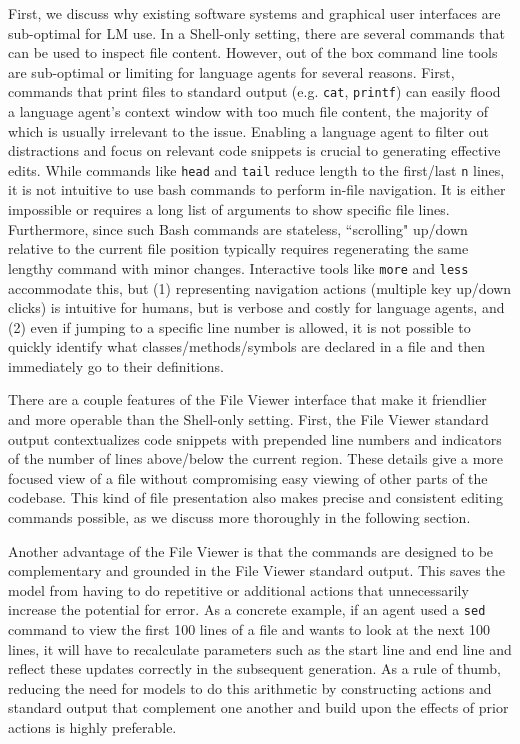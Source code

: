 First, we discuss why existing software systems and graphical user interfaces are sub-optimal for LM use.
In a Shell-only setting, there are several commands that can be used to inspect file content. However, out of the box command line tools are sub-optimal or limiting for language agents for several reasons.
First, commands that print files to standard output (e.g. \texttt{cat}, \texttt{printf}) can easily flood a language agent's context window with too much file content, the majority of which is usually irrelevant to the issue.
Enabling a language agent to filter out distractions and focus on relevant code snippets is crucial to generating effective edits.
While commands like \texttt{head} and \texttt{tail} reduce length to the first/last \texttt{n} lines, it is not intuitive to use bash commands to perform in-file navigation.
It is either impossible or requires a long list of arguments to show specific file lines.
Furthermore, since such Bash commands are stateless, ``scrolling" up/down relative to the current file position typically requires regenerating the same lengthy command with minor changes.
Interactive tools like \texttt{more} and \texttt{less} accommodate this, but (1) representing navigation actions (multiple key up/down clicks) is intuitive for humans, but is verbose and costly for language agents, and (2) even if jumping to a specific line number is allowed, it is not possible to quickly identify what classes/methods/symbols are declared in a file and then immediately go to their definitions.



There are a couple features of the File Viewer interface that make it friendlier and more operable than the Shell-only setting.
First, the File Viewer standard output contextualizes code snippets with prepended line numbers and indicators of the number of lines above/below the current region.
These details give a more focused view of a file without compromising easy viewing of other parts of the codebase.
This kind of file presentation also makes precise and consistent editing commands possible, as we discuss more thoroughly in the following section.

Another advantage of the File Viewer is that the commands are designed to be complementary and grounded in the File Viewer standard output.
This saves the model from having to do repetitive or additional actions that unnecessarily increase the potential for error.
As a concrete example, if an agent used a \texttt{sed} command to view the first \num{100} lines of a file and wants to look at the next \num{100} lines, it will have to recalculate parameters such as the start line and end line and reflect these updates correctly in the subsequent generation.
As a rule of thumb, reducing the need for models to do this arithmetic by constructing actions and standard output that complement one another and build upon the effects of prior actions is highly preferable.


